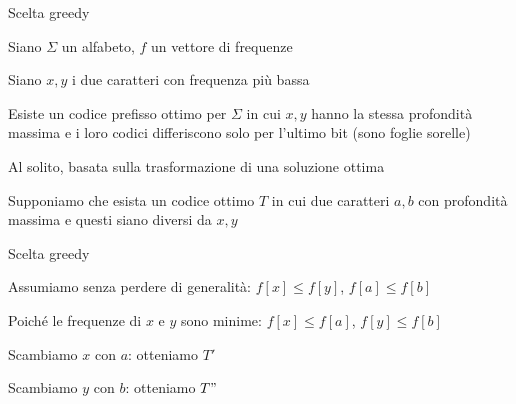 \begin{frame}{Scelta greedy}

\vspace{-9pt}
\begin{myboxtitle}[Ipotesi]
\BI
\item Siano $\Sigma$ un alfabeto, $f$ un vettore di frequenze
\item Siano $x, y$ i \alert{due caratteri con frequenza più bassa}
\EI
\end{myboxtitle}

\begin{myboxtitle}[Tesi]
\BI
\item Esiste un codice prefisso ottimo per $\Sigma$ in cui $x,y$ hanno la stessa 
profondità massima e i loro codici differiscono solo per l'ultimo bit (sono foglie sorelle)
\EI
\end{myboxtitle}

\begin{myboxtitle}[Dimostrazione]
\BI
\item Al solito, basata sulla trasformazione di una soluzione ottima
\item Supponiamo che esista un codice ottimo $T$ in cui due caratteri $a,b$ con profondità massima e questi siano diversi da $x,y$
\EI
\end{myboxtitle}

\end{frame}

\begin{frame}{Scelta greedy}

\vspace{-6pt}
\BIL
\item Assumiamo senza perdere di generalità: $f[x] \leq f[y]$,		$f[a] \leq f[b]$
\item Poiché le frequenze di $x$ e $y$ sono minime:    $f[x] \leq f[a]$,		$f[y] \leq f[b]$
\item Scambiamo $x$ con $a$: otteniamo $T'$
\item Scambiamo $y$ con $b$: otteniamo $T"$
\EIL


\end{frame}

